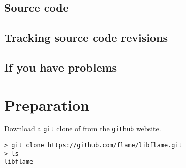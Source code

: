 \subsection{Source code}






\subsection{Tracking source code revisions}





\subsection{If you have problems}





%
%
%
%



\section{Preparation}

Download a {\tt git} clone of \libflame from the {\tt github} website.

\begin{Verbatim}[frame=single,framesep=2.5mm,xleftmargin=5mm,commandchars=\\\{\},fontsize=\footnotesize]
> git clone https://github.com/flame/libflame.git
> ls
libflame
\end{Verbatim}

